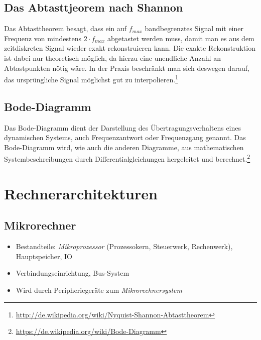 \subsection{Das Abtasttjeorem nach Shannon}
Das Abtasttheorem besagt, dass ein auf \(f_{max}\) bandbegrenztes Signal mit einer Frequenz von mindestens \(2\cdot f_{max}\) abgetastet werden muss, damit man es aus dem zeitdiskreten Signal wieder exakt rekonstruieren kann. Die exakte Rekonstruktion ist dabei nur theoretisch möglich, da hierzu eine unendliche Anzahl an Abtastpunkten nötig wäre. In der Praxis beschränkt man sich deswegen darauf, das ursprüngliche Signal möglichst gut zu interpolieren.\footnote{\url{http://de.wikipedia.org/wiki/Nyquist-Shannon-Abtasttheorem}}

\subsection{Bode-Diagramm}
Das Bode-Diagramm dient der Darstellung des Übertragungsverhaltens eines dynamischen Systems, auch Frequenzantwort oder Frequenzgang genannt.
Das Bode-Diagramm wird, wie auch die anderen Diagramme, aus mathematischen Systembeschreibungen durch Differentialgleichungen hergeleitet und berechnet.\footnote{\url{https://de.wikipedia.org/wiki/Bode-Diagramm}}



\section{Rechnerarchitekturen}

\subsection{Mikrorechner}
\begin{itemize}
	\item Bestandteile: \textit{Mikroprozessor} (Prozessokern, Steuerwerk, Rechenwerk), Hauptspeicher, IO
	\item Verbindungseinrichtung, Bus-System
	\item Wird durch Peripheriegeräte zum \textit{Mikrorechnersystem}
\end{itemize}


